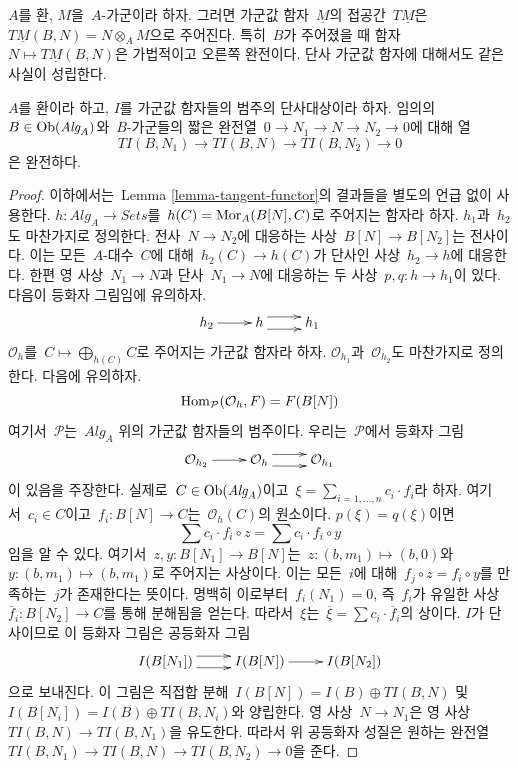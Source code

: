 \noindent
$A$를 환, $M$을\  $A$-가군이라 하자. 그러면 가군값 함자\ 
$\underline{M}$의 접공간\  $T\underline{M}$은\ 
$T\underline{M}(B, N) = N \otimes_A M$으로 주어진다. 특히\  $B$가
주어졌을 때 함자\  $N \mapsto T\underline{M}(B, N)$은 가법적이고
오른쪽 완전이다. 단사 가군값 함자에 대해서도 같은 사실이 성립한다.

\begin{lemma}
\label{lemma-tangent-injective}
$A$를 환이라 하고, $I$를 가군값 함자들의 범주의 단사대상이라 하자.
임의의\  $B \in \mathop{\mathrm{Ob}}\nolimits(\textit{Alg}_A)$와\  $B$-가군들의 짧은 완전열\ 
$0 \to N_1 \to N \to N_2 \to 0$에 대해 열
$$
TI(B, N_1) \to TI(B, N) \to TI(B, N_2) \to 0
$$
은 완전하다.
\end{lemma}

\begin{proof}
이하에서는\  Lemma \ref{lemma-tangent-functor}의 결과들을 별도의 언급
없이 사용한다. $h : \textit{Alg}_A \to \textit{Sets}$를\ 
$h(C) = \mathop{\mathrm{Mor}}\nolimits_A(B[N], C)$로 주어지는 함자라 하자. $h_1$과\  $h_2$도
마찬가지로 정의한다. 전사\  $N \to N_2$에 대응하는 사상\ 
$B[N] \to B[N_2]$는 전사이다. 이는 모든\  $A$-대수\  $C$에 대해\ 
$h_2(C) \to h(C)$가 단사인 사상\  $h_2 \to h$에 대응한다.
한편 영 사상\  $N_1 \to N$과 단사\  $N_1 \to N$에 대응하는 두 사상\ 
$p, q : h \to h_1$이 있다. 다음이 등화자 그림임에 유의하자.
$$
\xymatrix{
h_2 \ar[r] & h \ar@<1ex>[r] \ar@<-1ex>[r] & h_1
}
$$
$\mathcal{O}_h$를\  $C \mapsto \bigoplus_{h(C)} C$로 주어지는 가군값
함자라 하자. $\mathcal{O}_{h_1}$과\  $\mathcal{O}_{h_2}$도 마찬가지로
정의한다. 다음에 유의하자.
$$
\mathop{\mathrm{Hom}}\nolimits_\mathcal{P}(\mathcal{O}_h, F) = F(B[N])
$$
여기서\  $\mathcal{P}$는\  $\textit{Alg}_A$ 위의 가군값 함자들의
범주이다. 우리는\  $\mathcal{P}$에서 등화자 그림
$$
\xymatrix{
\mathcal{O}_{h_2} \ar[r] &
\mathcal{O}_h \ar@<1ex>[r] \ar@<-1ex>[r] &
\mathcal{O}_{h_1}
}
$$
이 있음을 주장한다. 실제로\  $C \in \mathop{\mathrm{Ob}}\nolimits(\textit{Alg}_A)$이고\ 
$\xi = \sum_{i = 1, \ldots, n} c_i \cdot f_i$라 하자. 여기서\ 
$c_i \in C$이고\  $f_i : B[N] \to C$는\  $\mathcal{O}_h(C)$의 원소이다.
$p(\xi) = q(\xi)$이면
$$
\sum c_i \cdot f_i \circ z = \sum c_i \cdot f_i \circ y
$$
임을 알 수 있다. 여기서\  $z, y : B[N_1] \to B[N]$는\ 
$z : (b, m_1) \mapsto (b, 0)$와\ 
$y : (b, m_1) \mapsto (b, m_1)$로 주어지는 사상이다. 이는 모든\ 
$i$에 대해\  $f_j \circ z = f_i \circ y$를 만족하는\  $j$가 존재한다는
뜻이다. 명백히 이로부터\  $f_i(N_1) = 0$, 즉\  $f_i$가 유일한 사상\ 
$\overline{f}_i : B[N_2] \to C$를 통해 분해됨을 얻는다. 따라서\ 
$\xi$는\  $\overline{\xi} = \sum c_i \cdot \overline{f}_i$의 상이다.
$I$가 단사이므로 이 등화자 그림은 공등화자 그림
$$
\xymatrix{
I(B[N_1]) \ar@<1ex>[r] \ar@<-1ex>[r] &
I(B[N]) \ar[r] &
I(B[N_2])
}
$$
으로 보내진다. 이 그림은 직접합 분해\ 
$I(B[N]) = I(B) \oplus TI(B, N)$ 및\ 
$I(B[N_i]) = I(B) \oplus TI(B, N_i)$와 양립한다.
영 사상\  $N \to N_1$은 영 사상\ 
$TI(B, N) \to TI(B, N_1)$을 유도한다. 따라서 위 공등화자 성질은
원하는 완전열\ 
$TI(B, N_1) \to TI(B, N) \to TI(B, N_2) \to 0$을 준다.
\end{proof}

